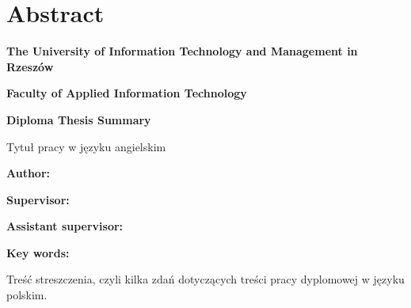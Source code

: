 \chapter*{Abstract}
\label{cha:abstract-en}
\makeatletter


\noindent \textbf{The University of Information Technology and Management in Rzeszów}

\noindent \textbf{Faculty of Applied Information Technology}


\begin{center}
    \textbf{Diploma Thesis Summary}

    Tytuł pracy w języku angielskim
\end{center}


\noindent \textbf{Author:}

\noindent \textbf{Supervisor:}

\noindent \textbf{Assistant supervisor:}

\noindent \textbf{Key words:} 

Treść streszczenia, czyli kilka zdań dotyczących treści pracy dyplomowej w języku polskim.



